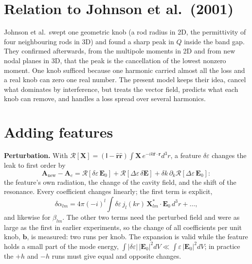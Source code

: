 \documentclass[11pt]{article}
\begin{document}
\section{Relation to Johnson et al.\ (2001)}
Johnson et al.\ swept one geometric knob (a rod radius in 2D, the permittivity of four neighbouring rods in 3D) and found a sharp peak in $Q$ inside the band gap. They confirmed afterwards, from the multipole moments in 2D and from new nodal planes in 3D, that the peak is the cancellation of the lowest nonzero moment. One knob sufficed because one harmonic carried almost all the loss and a real knob can zero one real number. The present model keeps their idea, cancel what dominates by interference, but treats the vector field, predicts what each knob can remove, and handles a loss spread over several harmonics.

\section{Adding features}
\textbf{Perturbation.} With $\mathcal R[\mathbf X]=(\mathsf I-\hat{\mathbf r}\hat{\mathbf r})\int\mathbf X\,e^{-ik\hat{\mathbf r}\cdot\mathbf r}d^3r$, a feature $\delta\varepsilon$ changes the leak to first order by
\begin{equation}
\mathbf A_\text{new}-\mathbf A_c=\mathcal R[\delta\varepsilon\,\mathbf E_0]+\mathcal R[\Delta\varepsilon\,\delta\mathbf E]+\delta k\,\partial_k\mathcal R[\Delta\varepsilon\,\mathbf E_0]:
\end{equation}
the feature's own radiation, the change of the cavity field, and the shift of the resonance. Every coefficient changes linearly; the first term is explicit,
\begin{equation}
\delta\alpha_{lm}=4\pi(-i)^l\int\delta\varepsilon\,j_l(kr)\,\mathbf X^*_{lm}\cdot\mathbf E_0\,d^3r+\ldots,
\end{equation}
and likewise for $\beta_{lm}$. The other two terms need the perturbed field and were as large as the first in earlier experiments, so the change of all coefficients per unit knob, $\mathbf b$, is measured: two runs per knob. The expansion is valid while the feature holds a small part of the mode energy, $\int|\delta\varepsilon|\,|\mathbf E_0|^2dV\ll\int\varepsilon\,|\mathbf E_0|^2dV$; in practice the $+h$ and $-h$ runs must give equal and opposite changes.
\end{document}
